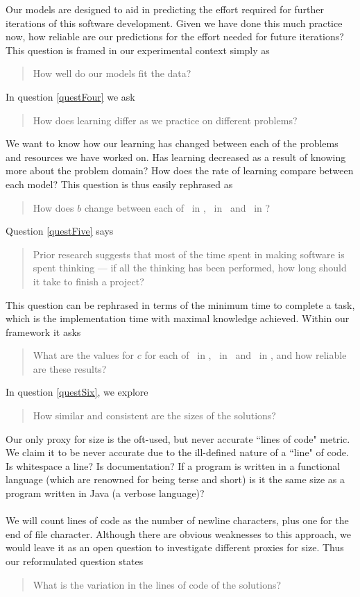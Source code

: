 Our models are designed to aid in predicting the effort required for further iterations of
this software development.
Given we have done this much practice now, how reliable are our predictions for
the effort needed for future iterations?
This question is framed in our experimental context simply as
\begin{quote}
  How well do our models fit the data?
\end{quote}\label{qq3}

In question \ref{questFour} we ask
\begin{quote}
  How does learning differ as we practice on different problems? 
\end{quote}

We want to know how our learning has changed between each of the problems and
resources we have worked on.
Has learning decreased as a result of knowing more about the problem domain?
How does the rate of learning compare between each model?
This question is thus easily rephrased as
\begin{quote}
   How does $b$ change between each of \PO\ in \LA, \PO\ in
   \LB\ and \PT\ in \LA?
\end{quote} \label{qq4}

Question \ref{questFive} says
\begin{quote}
  Prior research suggests that most of the time spent in making software is spent
  thinking --- if all the thinking has been performed, how long should it take to
  finish a project?
\end{quote}

This question can be rephrased in terms of the minimum time to complete a task,
which is the implementation time with maximal knowledge achieved.
Within our framework it asks
\begin{quote}
  What are the values for $c$ for each of \PO\ in \LA, \PO\ in \LB\ and \PT\ in
  \LA, and how reliable are these results?
\end{quote} \label{qq5}

In question \ref{questSix}, we explore
\begin{quote}
  How similar and consistent are the sizes of the solutions?
\end{quote}

Our only proxy for size is the oft-used, but never accurate ``lines of code"
metric.
We claim it to be never accurate due to the ill-defined nature of a ``line" of
code.
Is whitespace a line?
Is documentation?
If a program is written in a functional language (which are renowned for being
terse and short) is it the same size as a program written in Java (a verbose
language)?\\
\\
We will count lines of code as the number of newline characters, plus one for the end of file
character.
Although there are obvious weaknesses to this approach, we would leave it as an open question to
investigate different proxies for size.
Thus our reformulated question states
\begin{quote}
  What is the variation in the lines of code of the solutions?
\end{quote} \label{qq6}

